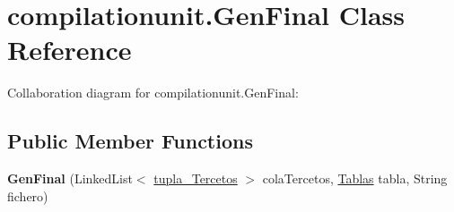 \hypertarget{classcompilationunit_1_1_gen_final}{
\section{compilationunit.GenFinal Class Reference}
\label{classcompilationunit_1_1_gen_final}
}


Collaboration diagram for compilationunit.GenFinal:
\subsection*{Public Member Functions}
\begin{DoxyCompactItemize}
\item 
\hypertarget{classcompilationunit_1_1_gen_final_a7cb74b7decc1e09edc20f3a96f97dea5}{
{\bfseries GenFinal} (LinkedList$<$ \hyperlink{classcompilationunit_1_1tupla___tercetos}{tupla\_\-Tercetos} $>$ colaTercetos, \hyperlink{classcompilationunit_1_1_tablas}{Tablas} tabla, String fichero)}
\label{classcompilationunit_1_1_gen_final_a7cb74b7decc1e09edc20f3a96f97dea5}

\end{DoxyCompactItemize}
